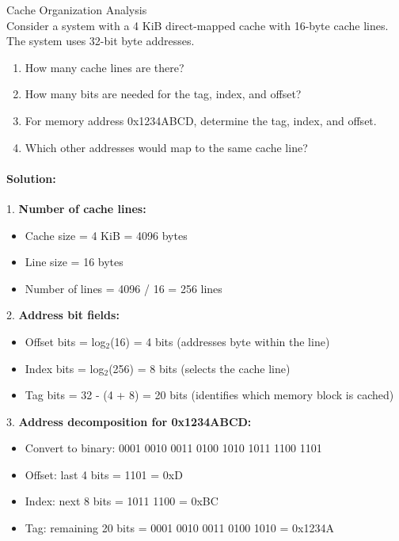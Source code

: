 \begin{example2}{Cache Organization Analysis}\\
Consider a system with a 4 KiB direct-mapped cache with 16-byte cache lines. The system uses 32-bit byte addresses.

\begin{enumerate}
    \item How many cache lines are there?
    \item How many bits are needed for the tag, index, and offset?
    \item For memory address 0x1234ABCD, determine the tag, index, and offset.
    \item Which other addresses would map to the same cache line?
\end{enumerate}

\tcblower
\paragraph{Solution:}

1. \textbf{Number of cache lines:}
   \begin{itemize}
     \item Cache size = 4 KiB = 4096 bytes
     \item Line size = 16 bytes
     \item Number of lines = 4096 / 16 = 256 lines
   \end{itemize}

2. \textbf{Address bit fields:}
   \begin{itemize}
     \item Offset bits = log$_2$(16) = 4 bits (addresses byte within the line)
     \item Index bits = log$_2$(256) = 8 bits (selects the cache line)
     \item Tag bits = 32 - (4 + 8) = 20 bits (identifies which memory block is cached)
   \end{itemize}

3. \textbf{Address decomposition for 0x1234ABCD:}
   \begin{itemize}
     \item Convert to binary: 0001 0010 0011 0100 1010 1011 1100 1101
     \item Offset: last 4 bits = 1101 = 0xD
     \item Index: next 8 bits = 1011 1100 = 0xBC
     \item Tag: remaining 20 bits = 0001 0010 0011 0100 1010 = 0x1234A
   \end{itemize}


\end{example2}
